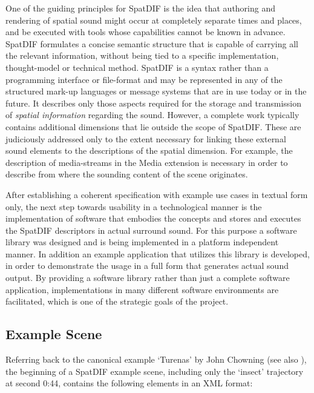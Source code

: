 \documentclass[a4paper]{article}
\begin{document}
One of the guiding principles for SpatDIF is the idea that authoring and rendering of spatial sound might occur at completely separate times and places, and be executed with tools whose capabilities cannot be known in advance. 
SpatDIF formulates a concise semantic structure that is capable of carrying all the relevant information, without being tied to a specific implementation, thought-model or technical method. 
SpatDIF is a syntax rather than a programming interface or file-format and may be represented in any of the structured mark-up languages or message systems that are in use today or in the future. 
It describes only those aspects required for the storage and transmission of \emph{spatial information} regarding the sound.
However, a complete work typically contains additional dimensions that lie outside the scope of SpatDIF. 
These are judiciously addressed only to the extent necessary for linking these external sound elements to the descriptions of the spatial dimension. 
For example, the description of media-streams in the Media extension is necessary in order to describe from where the sounding content of the scene originates.

After establishing a coherent specification with example use cases in textual form only, the next step towards usability in a technological manner is the implementation of software that embodies the concepts and stores and executes the SpatDIF descriptors in actual surround sound.
For this purpose a software library was designed and is being implemented in a platform independent manner. 
In addition an example application that utilizes this library is developed, in order to demonstrate the usage in a full form that generates actual sound output.
By providing a software library rather than just a complete software application, implementations in many different software environments are facilitated, which is one of the  strategic goals of the project.

\subsection{Example Scene}
 
Referring back to the canonical example `Turenas' by John Chowning (see also \cite{Peters:2013SpatDifCMJ}), the beginning of a SpatDIF example scene, including only the `insect' trajectory at second 0:44, contains the following elements in an XML format:

 
\end{document}
